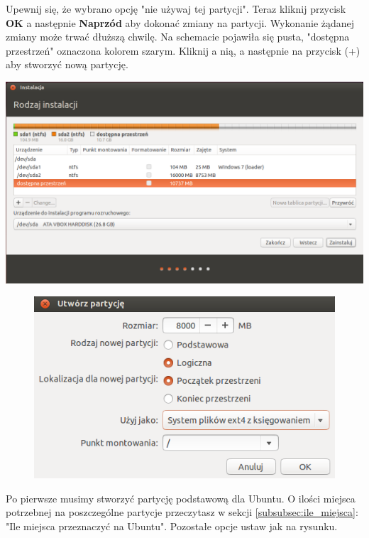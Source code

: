 Upewnij się, że wybrano opcję "nie używaj tej partycji". Teraz kliknij przycisk \textbf{OK} a następnie \textbf{Naprzód} aby dokonać zmiany na partycji. Wykonanie żądanej zmiany może trwać dłuższą chwilę.
Na schemacie pojawiła się pusta, "dostępna przestrzeń" oznaczona kolorem szarym. Kliknij a nią, a następnie na przycisk (+) aby stworzyć nową partycję.
\begin{center}
        \includegraphics[scale=0.7]{images/instalator_partycjonowanie_gparted3.png}
\end{center}
\clearpage
\begin{figure}
                \includegraphics[scale=0.8]{images/instalator_partycjonowanie_gparted_dodaj_root.png}
\end{figure}
Po pierwsze musimy stworzyć partycję podstawową dla Ubuntu. O ilości miejsca potrzebnej na poszczególne partycje przeczytasz w sekcji \ref{subsubsec:ile_miejsca}: "Ile miejsca przeznaczyć na Ubuntu". Pozostałe opcje ustaw jak na rysunku.
